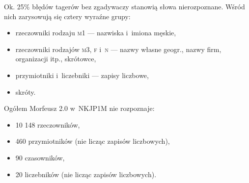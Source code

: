 \documentclass[xcolor=dvipsnames,polish]{beamer}
\begin{document}
\begin{frame}[allowframebreaks]
\begin{columns}
  \end{columns}

 \framebreak

Ok. 25\% błędów tagerów bez zgadywaczy stanowią słowa
nierozpoznane. Wśród nich zarysowują się cztery wyraźne grupy:
\begin{itemize}
\item rzeczowniki rodzaju \textsc{m1} --- nazwiska i~imiona męskie,
\item rzeczowniki rodzajów \textsc{m3}, \textsc{f} i~\textsc{n}
  --- nazwy własne geogr., nazwy firm, organizacji itp., skrótowce,
\item przymiotniki i~liczebniki --- zapisy liczbowe,
\item skróty.
\end{itemize}

\bigskip

Ogółem Morfeusz 2.0 w~NKJP1M nie rozpoznaje: 
\begin{itemize}
\item 10 148 rzeczowników, 
\item 460 przymiotników (nie licząc zapisów liczbowych),
\item 90 czasowników,
\item 20 liczebników (nie licząc zapisów liczbowych).
\end{itemize}
\end{frame}
\end{document}
